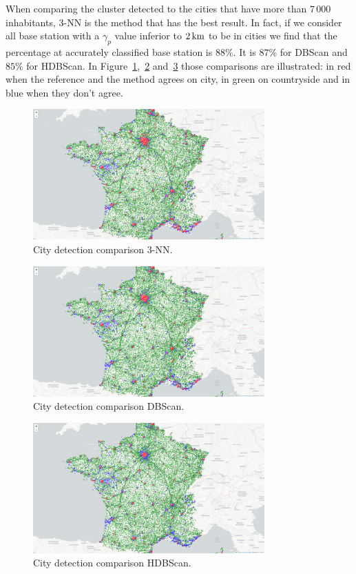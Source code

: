 \documentclass[lettersize,journal,english]{IEEEtran}
\begin{document}
        When comparing the cluster detected to the cities that have more than $7\,000$ inhabitants, $3$-NN is the method that has the best result. In fact, if we consider all base station with a $\gamma_p$ value inferior to $\unit[2]{km}$ to be in cities we find that the percentage at accurately classified base station is $88\%$. It is $87\%$ for DBScan and $85\%$ for HDBScan. In Figure~\ref{fig:com_3NN},~\ref{fig:com_dbs} and~\ref{fig:com_hdb} those comparisons are illustrated: in red when the reference and the method agrees on city, in green on countryside and in blue when they don't agree.
        \begin{figure}
            \centering
            \includegraphics[width=3.5in]{images/city_det_comp/comp_3-NN.png}
            \caption{City detection comparison $3$-NN.}
            \label{fig:com_3NN}
        \end{figure}
        \begin{figure}
            \centering
            \includegraphics[width=3.5in]{images/city_det_comp/comp_dbs.png}
            \caption{City detection comparison DBScan.}
            \label{fig:com_dbs}
        \end{figure}
        \begin{figure}
            \centering
            \includegraphics[width=3.5in]{images/city_det_comp/comp_hdbs.png}
            \caption{City detection comparison HDBScan.}
            \label{fig:com_hdb}
        \end{figure}
\end{document}
